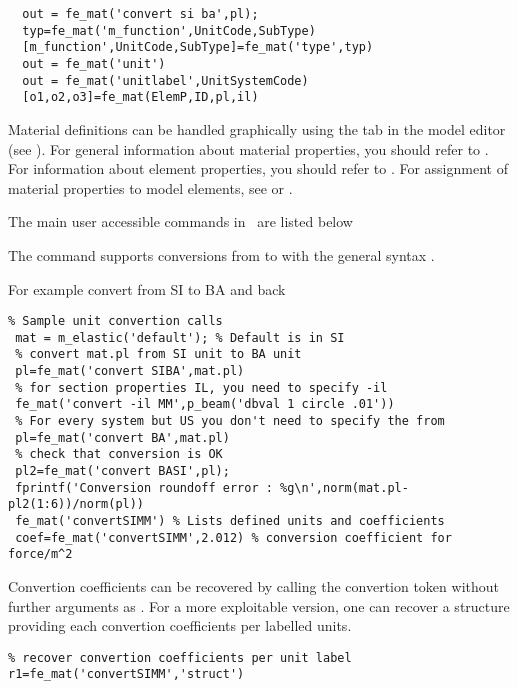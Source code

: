 \rsyntax\begin{verbatim}
  out = fe_mat('convert si ba',pl);
  typ=fe_mat('m_function',UnitCode,SubType)
  [m_function',UnitCode,SubType]=fe_mat('type',typ)
  out = fe_mat('unit')
  out = fe_mat('unitlabel',UnitSystemCode)
  [o1,o2,o3]=fe_mat(ElemP,ID,pl,il)
\end{verbatim}


Material definitions can be handled graphically using the  tab in the model editor (see ). For general information about material properties, you should refer to . For information about element properties, you should refer to . For assignment of material properties to model elements, see   or .

The main user accessible commands in \femat\ are listed below


The  command supports conversions from  to  with the general syntax . 

For example convert from SI to BA and back
\begin{verbatim}
% Sample unit convertion calls
 mat = m_elastic('default'); % Default is in SI
 % convert mat.pl from SI unit to BA unit
 pl=fe_mat('convert SIBA',mat.pl)
 % for section properties IL, you need to specify -il
 fe_mat('convert -il MM',p_beam('dbval 1 circle .01'))
 % For every system but US you don't need to specify the from
 pl=fe_mat('convert BA',mat.pl)
 % check that conversion is OK
 pl2=fe_mat('convert BASI',pl);
 fprintf('Conversion roundoff error : %g\n',norm(mat.pl-pl2(1:6))/norm(pl))
 fe_mat('convertSIMM') % Lists defined units and coefficients
 coef=fe_mat('convertSIMM',2.012) % conversion coefficient for force/m^2
\end{verbatim}%

Convertion coefficients can be recovered by calling the convertion token without further arguments as . For a more exploitable version, one can recover a structure providing each convertion coefficients per labelled units.

\begin{verbatim}
% recover convertion coefficients per unit label
r1=fe_mat('convertSIMM','struct')
\end{verbatim}%

